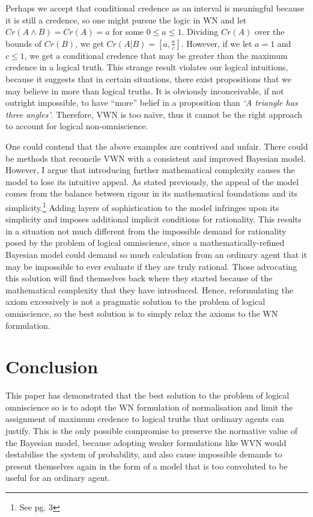 \documentclass[12pt]{article}
\begin{document}
Perhaps we accept that conditional credence as an interval is meaningful because it is still a credence, so one might pursue the logic in WN and let $Cr(A\land B)=Cr(A)=a$ for some $0\leq a\leq1$. Dividing $Cr(A)$ over the bounds of $Cr(B)$, we get $Cr(A|B)=[a,\frac{a}{c}]$. However, if we let $a=1$ and $c\leq 1$, we get a conditional credence that may be greater than the maximum credence in a logical truth. This strange result violates our logical intuitions, because it suggests that in certain situations, there exist propositions that we may believe in more than logical truths. It is obviously inconceivable, if not outright impossible, to have ``more'' belief in a proposition than \textit{`A triangle has three angles'}. Therefore, VWN is too na\"ive, thus it cannot be the right approach to account for logical non-omniscience.

One could contend that the above examples are contrived and unfair. There could be methods that reconcile VWN with a consistent and improved Bayesian model. However, I argue that introducing further mathematical complexity causes the model to lose its intuitive appeal. As stated previously, the appeal of the model comes from the balance between rigour in its mathematical foundations and its simplicity.\footnote{See pg. 3} Adding layers of sophistication to the model infringes upon its simplicity and  imposes additional implicit conditions for rationality. This results in a situation not much different from the impossible demand for rationality posed by the problem of logical omniscience, since a mathematically-refined Bayesian model could demand so much calculation from an ordinary agent that it may be impossible to ever evaluate if they are truly rational. Those advocating this solution will find themselves back where they started because of the mathematical complexity that they have introduced. Hence, reformulating the axiom excessively is not a pragmatic solution to the problem of logical omniscience, so the best solution is to simply relax the axioms to the WN formulation.
\section{Conclusion}
This paper has demonstrated that the best solution to the problem of logical omniscience so is to adopt the WN formulation of normalisation and limit the assignment of maximum credence to logical truths that ordinary agents can justify. This is the only possible compromise to preserve the normative value of the Bayesian model, because adopting weaker formulations like WVN would destabilise the system of probability, and also cause impossible demands to present themselves again in the form of a model that is too convoluted to be useful for an ordinary agent.
\pagebreak
\printbibliography
\end{document}
